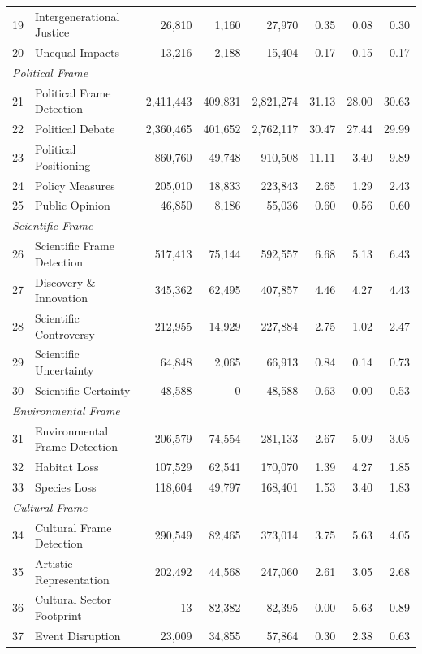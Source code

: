 {\begin{longtable}{p{0.5cm}p{5.5cm}rrrrrr}
19 & Intergenerational Justice & 26,810 & 1,160 & 27,970 & 0.35 & 0.08 & 0.30 \\
20 & Unequal Impacts & 13,216 & 2,188 & 15,404 & 0.17 & 0.15 & 0.17 \\
\midrule
\multicolumn{8}{l}{\textit{Political Frame}} \\
21 & Political Frame Detection & 2,411,443 & 409,831 & 2,821,274 & 31.13 & 28.00 & 30.63 \\
22 & Political Debate & 2,360,465 & 401,652 & 2,762,117 & 30.47 & 27.44 & 29.99 \\
23 & Political Positioning & 860,760 & 49,748 & 910,508 & 11.11 & 3.40 & 9.89 \\
24 & Policy Measures & 205,010 & 18,833 & 223,843 & 2.65 & 1.29 & 2.43 \\
25 & Public Opinion & 46,850 & 8,186 & 55,036 & 0.60 & 0.56 & 0.60 \\
\midrule
\multicolumn{8}{l}{\textit{Scientific Frame}} \\
26 & Scientific Frame Detection & 517,413 & 75,144 & 592,557 & 6.68 & 5.13 & 6.43 \\
27 & Discovery \& Innovation & 345,362 & 62,495 & 407,857 & 4.46 & 4.27 & 4.43 \\
28 & Scientific Controversy & 212,955 & 14,929 & 227,884 & 2.75 & 1.02 & 2.47 \\
29 & Scientific Uncertainty & 64,848 & 2,065 & 66,913 & 0.84 & 0.14 & 0.73 \\
30 & Scientific Certainty & 48,588 & 0 & 48,588 & 0.63 & 0.00 & 0.53 \\
\midrule
\multicolumn{8}{l}{\textit{Environmental Frame}} \\
31 & Environmental Frame Detection & 206,579 & 74,554 & 281,133 & 2.67 & 5.09 & 3.05 \\
32 & Habitat Loss & 107,529 & 62,541 & 170,070 & 1.39 & 4.27 & 1.85 \\
33 & Species Loss & 118,604 & 49,797 & 168,401 & 1.53 & 3.40 & 1.83 \\
\midrule
\multicolumn{8}{l}{\textit{Cultural Frame}} \\
34 & Cultural Frame Detection & 290,549 & 82,465 & 373,014 & 3.75 & 5.63 & 4.05 \\
35 & Artistic Representation & 202,492 & 44,568 & 247,060 & 2.61 & 3.05 & 2.68 \\
36 & Cultural Sector Footprint & 13 & 82,382 & 82,395 & 0.00 & 5.63 & 0.89 \\
37 & Event Disruption & 23,009 & 34,855 & 57,864 & 0.30 & 2.38 & 0.63 \\

\end{longtable}}
